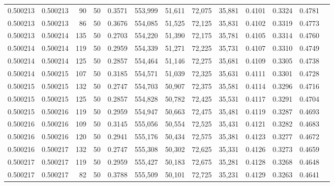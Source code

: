 \begin{tabular}{rrrrrrrrrrrrr}
0.500213 & 0.500213 &    90 &  50 &                                     0.3571 & 553,999 &  51,611 &  72,075 &  35,881 & 0.4101 & 0.3324 & 0.4781 \\
0.500213 & 0.500213 &    86 &  50 &                                     0.3676 & 554,085 &  51,525 &  72,125 &  35,831 & 0.4102 & 0.3319 & 0.4773 \\
0.500213 & 0.500214 &   135 &  50 &                                     0.2703 & 554,220 &  51,390 &  72,175 &  35,781 & 0.4105 & 0.3314 & 0.4760 \\
0.500214 & 0.500214 &   119 &  50 &                                     0.2959 & 554,339 &  51,271 &  72,225 &  35,731 & 0.4107 & 0.3310 & 0.4749 \\
0.500214 & 0.500214 &   125 &  50 &                                     0.2857 & 554,464 &  51,146 &  72,275 &  35,681 & 0.4109 & 0.3305 & 0.4738 \\
0.500214 & 0.500215 &   107 &  50 &                                     0.3185 & 554,571 &  51,039 &  72,325 &  35,631 & 0.4111 & 0.3301 & 0.4728 \\
0.500215 & 0.500215 &   132 &  50 &                                     0.2747 & 554,703 &  50,907 &  72,375 &  35,581 & 0.4114 & 0.3296 & 0.4716 \\
0.500215 & 0.500215 &   125 &  50 &                                     0.2857 & 554,828 &  50,782 &  72,425 &  35,531 & 0.4117 & 0.3291 & 0.4704 \\
0.500215 & 0.500216 &   119 &  50 &                                     0.2959 & 554,947 &  50,663 &  72,475 &  35,481 & 0.4119 & 0.3287 & 0.4693 \\
0.500216 & 0.500216 &   109 &  50 &                                     0.3145 & 555,056 &  50,554 &  72,525 &  35,431 & 0.4121 & 0.3282 & 0.4683 \\
0.500216 & 0.500216 &   120 &  50 &                                     0.2941 & 555,176 &  50,434 &  72,575 &  35,381 & 0.4123 & 0.3277 & 0.4672 \\
0.500216 & 0.500217 &   132 &  50 &                                     0.2747 & 555,308 &  50,302 &  72,625 &  35,331 & 0.4126 & 0.3273 & 0.4659 \\
0.500217 & 0.500217 &   119 &  50 &                                     0.2959 & 555,427 &  50,183 &  72,675 &  35,281 & 0.4128 & 0.3268 & 0.4648 \\
0.500217 & 0.500217 &    82 &  50 &                                     0.3788 & 555,509 &  50,101 &  72,725 &  35,231 & 0.4129 & 0.3263 & 0.4641 \\

\end{tabular}
